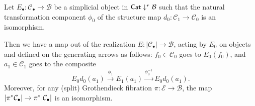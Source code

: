 \documentclass[a4paper,10pt
,draft
]{article}%
\renewcommand{\1}{\eta}%
\begin{document}
\begin{proposition}
      \label{PIREAL_PROP}
      Let $E_\bullet: \mathcal C_\bullet \to \mathcal B$ be a simplicial object in $\mathsf{Cat} \downarrow^r \mathcal B$
      such that the natural transformation component $\phi_0$ of the structure map $d_0: \mathcal C_1 \to \mathcal C_0$
      is an isomorphism.

      Then we have a map out of the realization $E: |\mathcal C_\bullet| \to \mathcal B$,
      acting by $E_0$ on objects and defined on the generating arrows as follows:
      $f_0 \in \mathcal C_0$ goes to $E_0(f_0)$, and $a_1 \in \mathcal C_1$ goes to the composite
      \begin{equation}
            E_0 d_0(a_1) \xrightarrow{\phi_1} E_1(a_1) \xrightarrow{\phi_0^{-1}} E_0 d_0(a_1).
      \end{equation}
      Moreover, for any (split) Grothendieck fibration $\pi: \mathcal E \to \mathcal B$,
      the map $|\pi^{\**} \mathcal C_\bullet| \to \pi^{\**} |\mathcal C_\bullet|$ is an isomorphism.
\end{proposition}
\end{document}
